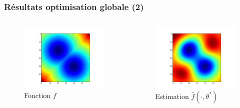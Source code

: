 \documentclass[c]{beamer}
\begin{document}
\begin{frame}
    \frametitle{Résultats optimisation globale (2)}
    \begin{columns}
        \begin{column}{.5\textwidth}
            \begin{figure}
                \centering
                \includegraphics[width=.8\textwidth]{regression_2d-ref}
                \caption{Fonction $f$}
            \end{figure}
        \end{column}
        \begin{column}{.5\textwidth}
            \begin{figure}
                \centering
                \includegraphics[width=.8\textwidth]{regression_2d-est}
                \caption{Estimation $\hat{f}(\cdot, \theta^*)$}
            \end{figure}
        \end{column}
    \end{columns}
\end{frame}
\end{document}
